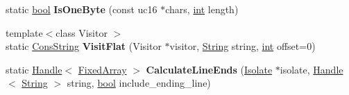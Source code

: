\begin{DoxyCompactItemize}
static \mbox{\hyperlink{classbool}{bool}} {\bfseries Is\+One\+Byte} (const uc16 $\ast$chars, \mbox{\hyperlink{classint}{int}} length)
\item 
\mbox{\label{classv8_1_1internal_1_1String_a6e43ec962a21d98a144ce1afc54ae52b}} 
{\footnotesize template$<$class Visitor $>$ }\\static \mbox{\hyperlink{classv8_1_1internal_1_1ConsString}{Cons\+String}} {\bfseries Visit\+Flat} (Visitor $\ast$visitor, \mbox{\hyperlink{classv8_1_1internal_1_1String}{String}} string, \mbox{\hyperlink{classint}{int}} offset=0)
\item 
\mbox{\label{classv8_1_1internal_1_1String_a77a81bc353d6d8d762908cdcff22646d}} 
static \mbox{\hyperlink{classv8_1_1internal_1_1Handle}{Handle}}$<$ \mbox{\hyperlink{classv8_1_1internal_1_1FixedArray}{Fixed\+Array}} $>$ {\bfseries Calculate\+Line\+Ends} (\mbox{\hyperlink{classv8_1_1internal_1_1Isolate}{Isolate}} $\ast$isolate, \mbox{\hyperlink{classv8_1_1internal_1_1Handle}{Handle}}$<$ \mbox{\hyperlink{classv8_1_1internal_1_1String}{String}} $>$ string, \mbox{\hyperlink{classbool}{bool}} include\+\_\+ending\+\_\+line)
\end{DoxyCompactItemize}
